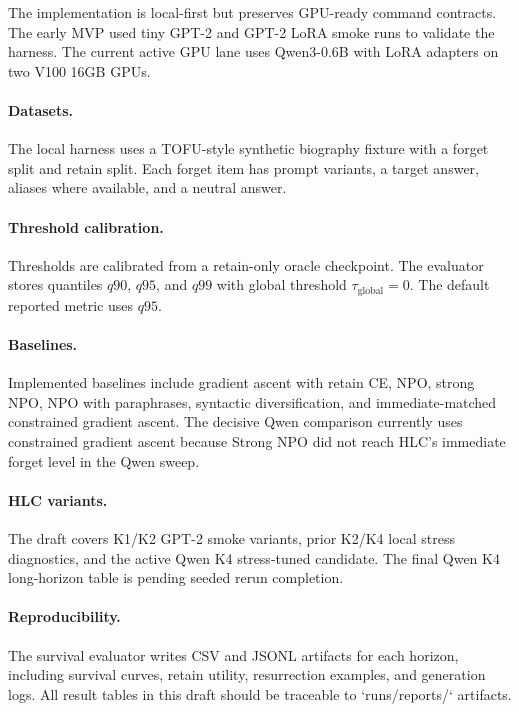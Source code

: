 The implementation is local-first but preserves GPU-ready command contracts.
The early MVP used tiny GPT-2 and GPT-2 LoRA smoke runs to validate the harness.
The current active GPU lane uses Qwen3-0.6B with LoRA adapters on two V100 16GB GPUs.

\paragraph{Datasets.}
The local harness uses a TOFU-style synthetic biography fixture with a forget split and retain split.
Each forget item has prompt variants, a target answer, aliases where available, and a neutral answer.

\paragraph{Threshold calibration.}
Thresholds are calibrated from a retain-only oracle checkpoint.
The evaluator stores quantiles $q90$, $q95$, and $q99$ with global threshold $\tau_{\mathrm{global}}=0$.
The default reported metric uses $q95$.

\paragraph{Baselines.}
Implemented baselines include gradient ascent with retain CE, NPO, strong NPO, NPO with paraphrases, syntactic diversification, and immediate-matched constrained gradient ascent.
The decisive Qwen comparison currently uses constrained gradient ascent because Strong NPO did not reach HLC's immediate forget level in the Qwen sweep.

\paragraph{HLC variants.}
The draft covers K1/K2 GPT-2 smoke variants, prior K2/K4 local stress diagnostics, and the active Qwen K4 stress-tuned candidate.
The final Qwen K4 long-horizon table is pending seeded rerun completion.

\paragraph{Reproducibility.}
The survival evaluator writes CSV and JSONL artifacts for each horizon, including survival curves, retain utility, resurrection examples, and generation logs.
All result tables in this draft should be traceable to `runs/reports/` artifacts.
